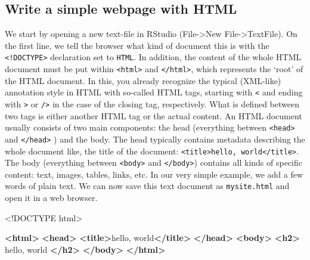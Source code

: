 \documentclass[
  12pt,
]{style/krantz}
\newenvironment{Shaded}{\begin{snugshade}}{\end{snugshade}}
\newcommand{\DataTypeTok}[1]{\textcolor[rgb]{0.13,0.29,0.53}{#1}}
\newcommand{\KeywordTok}[1]{\textcolor[rgb]{0.13,0.29,0.53}{\textbf{#1}}}
\newcommand{\NormalTok}[1]{#1}
\begin{document}
\hypertarget{write-a-simple-webpage-with-html}{%
\subsection{Write a simple webpage with HTML}\label{write-a-simple-webpage-with-html}}

We start by opening a new text-file in RStudio (File-\textgreater New File-\textgreater TextFile). On the first line, we tell the browser what kind of document this is with the \texttt{\textless{}!DOCTYPE\textgreater{}} declaration set to \texttt{HTML}. In addition, the content of the whole HTML document must be put within \texttt{\textless{}html\textgreater{}} and \texttt{\textless{}/html\textgreater{}}, which represents the `root' of the HTML document. In this, you already recognize the typical (XML-like) annotation style in HTML with so-called HTML tags, starting with \texttt{\textless{}} and ending with \texttt{\textgreater{}} or \texttt{/\textgreater{}} in the case of the closing tag, respectively. What is defined between two tags is either another HTML tag or the actual content. An HTML document usually consists of two main components: the head (everything between \texttt{\textless{}head\textgreater{}} and \texttt{\textless{}/head\textgreater{}} ) and the body. The head typically contains metadata describing the whole document like, the title of the document: \texttt{\textless{}title\textgreater{}hello,\ world\textless{}/title\textgreater{}}. The body (everything between \texttt{\textless{}body\textgreater{}} and \texttt{\textless{}/body\textgreater{}}) contains all kinds of specific content: text, images, tables, links, etc. In our very simple example, we add a few words of plain text. We can now save this text document as \texttt{mysite.html} and open it in a web browser.

\begin{Shaded}
\begin{Highlighting}[]
     \DataTypeTok{\textless{}!DOCTYPE }\NormalTok{html}\DataTypeTok{\textgreater{}}

     \KeywordTok{\textless{}html\textgreater{}}
         \KeywordTok{\textless{}head\textgreater{}}
             \KeywordTok{\textless{}title\textgreater{}}\NormalTok{hello, world}\KeywordTok{\textless{}/title\textgreater{}}
         \KeywordTok{\textless{}/head\textgreater{}}
         \KeywordTok{\textless{}body\textgreater{}}
             \KeywordTok{\textless{}h2\textgreater{}}\NormalTok{ hello, world }\KeywordTok{\textless{}/h2\textgreater{}}
         \KeywordTok{\textless{}/body\textgreater{}}
     \KeywordTok{\textless{}/html\textgreater{}}
\end{Highlighting}
\end{Shaded}
\end{document}
